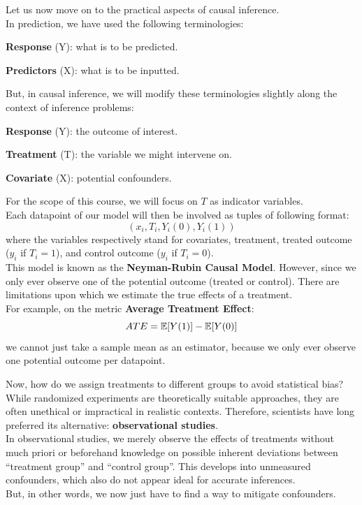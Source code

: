 Let us now move on to the practical aspects of causal inference. \\
In prediction, we have used the following terminologies:
\begin{bindenum}
    \item \textbf{Response} (Y): what is to be predicted.
    \item \textbf{Predictors} (X): what is to be inputted.
\end{bindenum}
But, in causal inference, we will modify these terminologies slightly along the context of inference problems:
\begin{bindenum}
    \item \textbf{Response} (Y): the outcome of interest.
    \item \textbf{Treatment} (T): the variable we might intervene on.
    \item \textbf{Covariate} (X): potential confounders.
\end{bindenum}
For the scope of this course, we will focus on $T$ as indicator variables. \\
Each datapoint of our model will then be involved as tuples of following format:
\[
    (x_i, T_i, Y_i (0), Y_i (1))
\]
where the variables respectively stand for covariates, treatment, treated outcome ($y_i$ if $T_i = 1$), and control outcome ($y_i$ if $T_i = 0$). \\
This model is known as the \textbf{Neyman-Rubin Causal Model}. However, since we only ever observe one of the potential outcome (treated or control). There are limitations upon which we estimate the true effects of a treatment. \\
For example, on the metric \textbf{Average Treatment Effect}:
\[ATE = \mathbb{E}[Y(1)] - \mathbb{E}[Y(0)]\]
we cannot just take a sample mean as an estimator, because we only ever observe one potential outcome per datapoint.

Now, how do we assign treatments to different groups to avoid statistical bias? \\
While randomized experiments are theoretically suitable approaches, they are often unethical or impractical in realistic contexts. Therefore, scientists have long preferred its alternative: \textbf{observational studies}. \\
In observational studies, we merely observe the effects of treatments without much priori or beforehand knowledge on possible inherent deviations between ``treatment group'' and ``control group''. This develops into unmeasured confounders, which also do not appear ideal for accurate inferences. \\
But, in other words, we now just have to find a way to mitigate confounders.

